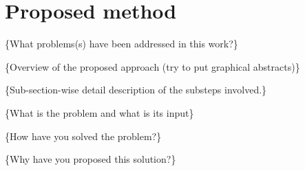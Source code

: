 \section{Proposed method}
\label{sec:method}


\{What problems(s) have been addressed in this work?\}

\{Overview of the proposed approach (try to put graphical abstracts)\}

\{Sub-section-wise detail description of the substeps involved.\}

\{What is the problem and what is its input\}

\{How have you solved the problem?\}

\{Why have you proposed this solution?\}






